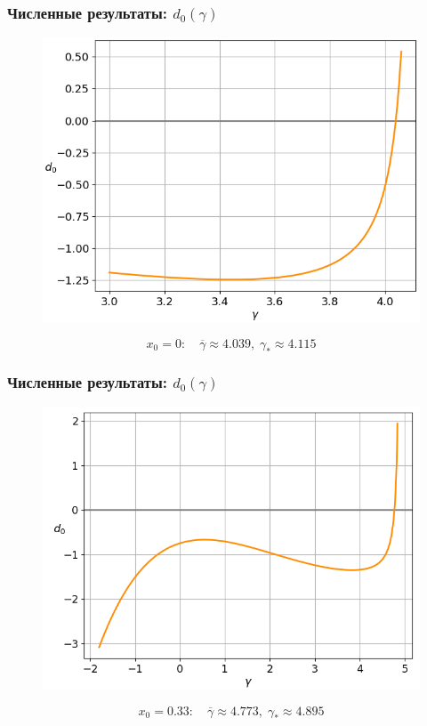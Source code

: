 \documentclass[fullscreen=true, unicode, bookmarks=false]{beamer}
\begin{document}
\begin{frame}
\frametitle{ Численные результаты: $ d_0(\gamma) $ }

\begin{figure} 
\includegraphics[scale=0.55]{divergent_d0_0,00.png}  
\end{figure}

$$ x_0 = 0: \quad \overline{\gamma} \approx 4.039, \; \gamma_* \approx 4.115 $$

\end{frame}

\begin{frame}
\frametitle{ Численные результаты: $ d_0(\gamma) $ }

\begin{figure} 
\includegraphics[scale=0.55]{divergent_d0_0,33.png}  
\end{figure}

$$ x_0 = 0.33: \quad \overline{\gamma} \approx 4.773, \; \gamma_* \approx 4.895 $$

\end{frame}
\end{document}
